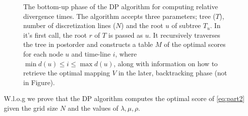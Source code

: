\documentclass{llncs}
\begin{document}
\begin{figure}[t]
\begin{center}
\begin{tabular}{|rl|}
\hline  
\end{tabular}
\end{center}
\caption{The bottom-up phase of the DP algorithm for computing relative
divergence times. The algorithm accepts three parameters; tree ($T$), number of
discretization lines ($N$) and the root $u$ of subtree  $T_u$. In it's first
call, the root $r$ of $T$ is passed as $u$.  It recursively traverses the tree
in postorder and constructs a table $M$ of the optimal scores for each node $u$
and time-line $i$, where $\min d(u) \leq i \leq \max d(u)$, along with
information on how to retrieve the optimal mapping $V$ in the later,
backtracking phase (not in Figure).}
\label{fig:dp}
\end{figure}

W.l.o.g we prove that the DP algorithm computes the optimal score of
\ref{eq:part2} given the grid size $N$ and the values of $\lambda,\mu,\rho$.
\end{document}
